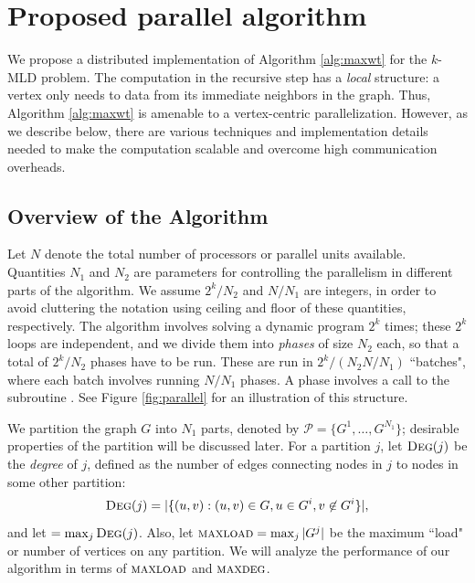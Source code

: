 \section{Proposed parallel algorithm}
\label{sec:proposed}
We propose a distributed implementation of Algorithm \ref{alg:maxwt} for the $k$-MLD problem. The computation in the recursive step has a \emph{local} structure: a vertex only needs to data from its immediate neighbors in the graph. Thus, Algorithm \ref{alg:maxwt} is amenable to a vertex-centric parallelization. However, as we describe below, there are various techniques and implementation details needed to make the computation scalable and overcome high communication overheads.  


\subsection{Overview of the Algorithm \parmaxwt{}}
Let $N$ denote the total number of
processors or parallel units available. Quantities $N_1$ and $N_2$ are parameters for controlling the parallelism
in different parts of the algorithm.  
We assume $2^k/N_2$ and $N/N_1$ are integers, in order to avoid cluttering the
notation using ceiling and floor of these quantities, respectively.
The algorithm involves solving a dynamic program $2^k$ times; these $2^k$ loops are independent, and we divide them into \emph{phases} of size $N_2$ each, so that a total of $2^k/N_2$ phases have to be run. These are run in $2^k/(N_2N/N_1)$ ``batches", where each batch involves running $N/N_1$ phases. A phase involves a call to the subroutine \parcircuit{}.
See Figure \ref{fig:parallel} for an illustration of this structure.

We partition the graph $G$ into $N_1$ parts, denoted by
$\mathcal{P}=\{G^1, \ldots, G^{N_1}\}$; desirable properties of the partition will be discussed later. For a partition $j$, let $\textsc{Deg}(j)$ be the \emph{degree} of $j$, defined as the number of edges connecting nodes in $j$ to nodes in some other partition:
$$
\textsc{Deg}(j) = |\{(u, v): (u, v) \in G, u \in G^i, v \not \in G^i\}|,
$$
and let \maxdeg{} $ = \max_{j} \textsc{Deg}(j)$. Also, let $\textsc{maxload}{} = \max_j |G^j|$ be the maximum ``load" or number of vertices on any partition. We will analyze the performance of our algorithm in terms of $\textsc{maxload}{}$ and $\textsc{maxdeg}{}$.

